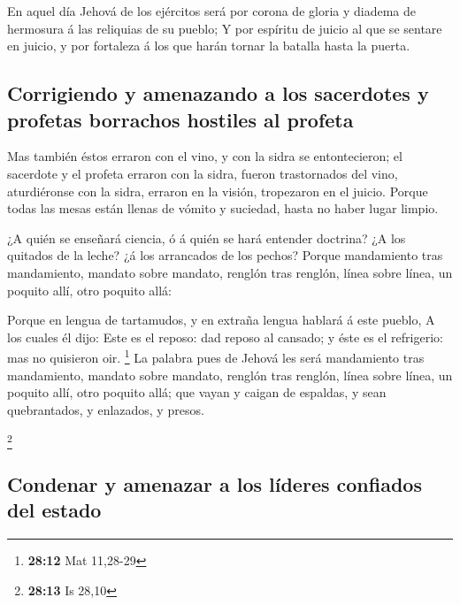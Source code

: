  En aquel día Jehová de los ejércitos será por corona de
gloria y diadema de hermosura á las reliquias de su pueblo;
 Y por espíritu de juicio al que se sentare en juicio, y
por fortaleza á los que harán tornar la batalla hasta la puerta.

\hypertarget{corrigiendo-y-amenazando-a-los-sacerdotes-y-profetas-borrachos-hostiles-al-profeta}{%
\subsection{Corrigiendo y amenazando a los sacerdotes y profetas
borrachos hostiles al
profeta}\label{corrigiendo-y-amenazando-a-los-sacerdotes-y-profetas-borrachos-hostiles-al-profeta}}

 Mas también éstos erraron con el vino, y con la sidra se
entontecieron; el sacerdote y el profeta erraron con la sidra, fueron
trastornados del vino, aturdiéronse con la sidra, erraron en la visión,
tropezaron en el juicio.  Porque todas las mesas están
llenas de vómito y suciedad, hasta no haber lugar limpio.

 ¿A quién se enseñará ciencia, ó á quién se hará entender
doctrina? ¿A los quitados de la leche? ¿á los arrancados de los pechos?
 Porque mandamiento tras mandamiento, mandato sobre
mandato, renglón tras renglón, línea sobre línea, un poquito allí, otro
poquito allá:

 Porque en lengua de tartamudos, y en extraña lengua
hablará á este pueblo,  A los cuales él dijo: Este es el
reposo: dad reposo al cansado; y éste es el refrigerio: mas no quisieron
oir. \footnote{\textbf{28:12} Mat 11,28-29}  La palabra
pues de Jehová les será mandamiento tras mandamiento, mandato sobre
mandato, renglón tras renglón, línea sobre línea, un poquito allí, otro
poquito allá; que vayan y caigan de espaldas, y sean quebrantados, y
enlazados, y presos.

\footnote{\textbf{28:13} Is 28,10}

\hypertarget{condenar-y-amenazar-a-los-luxedderes-confiados-del-estado}{%
\subsection{Condenar y amenazar a los líderes confiados del
estado}\label{condenar-y-amenazar-a-los-luxedderes-confiados-del-estado}}

